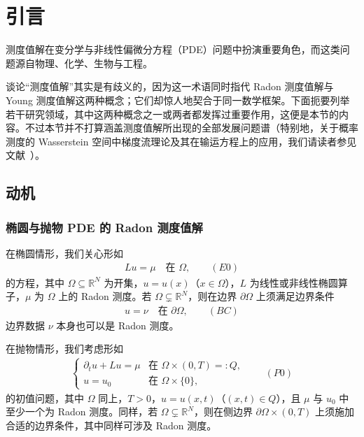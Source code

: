 \documentclass[../main.tex]{subfiles}
\begin{document}
\chapter*{引言}\label{chapter:introduction}

测度值解在变分学与非线性偏微分方程（PDE）问题中扮演重要角色，而这类问题源自物理、化学、生物与工程。

谈论“测度值解”其实是有歧义的，因为这一术语同时指代 Radon 测度值解与 Young 测度值解这两种概念；它们却惊人地契合于同一数学框架。下面扼要列举若干研究领域，其中这两种概念之一或两者都发挥过重要作用，这便是本节的内容。不过本节并不打算涵盖测度值解所出现的全部发展问题谱（特别地，关于概率测度的 Wasserstein 空间中梯度流理论及其在输运方程上的应用，我们请读者参见文献~\cite{ref06}）。

\section*{动机}\label{section:intro-motivation}

\subsection*{椭圆与抛物 PDE 的 Radon 测度值解}\label{subsection:intro-radon}

在椭圆情形，我们关心形如
\begin{align*}
Lu = \mu \quad \text{在 }\Omega, \qquad(E0)
\end{align*}
的方程，其中 $\Omega\subseteq\mathbb{R}^N$ 为开集，$u=u(x)$（$x\in\Omega$），$L$ 为线性或非线性椭圆算子，$\mu$ 为 $\Omega$ 上的 Radon 测度。若 $\Omega\subsetneq\mathbb{R}^N$，则在边界 $\partial\Omega$ 上须满足边界条件
\begin{align*}
u=\nu \quad \text{在 }\partial\Omega, \qquad(BC)
\end{align*}
边界数据 $\nu$ 本身也可以是 Radon 测度。

在抛物情形，我们考虑形如
\begin{align*}
\begin{cases}
\partial_t u + Lu = \mu & \text{在 }\Omega\times(0,T)=:Q,\\
u=u_0 & \text{在 }\Omega\times\{0\},
\end{cases}
\qquad(P0)
\end{align*}
的初值问题，其中 $\Omega$ 同上，$T>0$，$u=u(x,t)$（$(x,t)\in Q$），且 $\mu$ 与 $u_0$ 中至少一个为 Radon 测度。同样，若 $\Omega\subsetneq\mathbb{R}^N$，则在侧边界 $\partial\Omega\times(0,T)$ 上须施加合适的边界条件，其中同样可涉及 Radon 测度。
\end{document}
